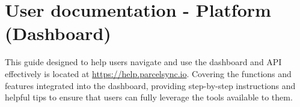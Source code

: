 \chapter{User documentation - Platform (Dashboard)}
This guide designed to help users navigate and use the dashboard and API effectively is located at \url{https://help.parcelsync.io}.
Covering the functions and features integrated into the dashboard, providing step-by-step instructions and helpful tips to ensure that users can fully leverage the tools available to them. 
